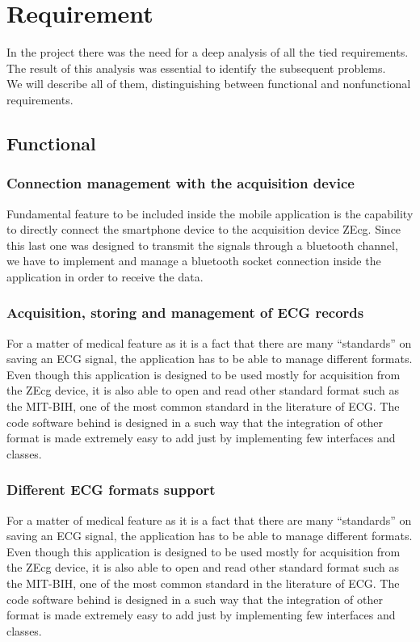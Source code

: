 \chapter{Requirement}
\label{Chapter5}
In the project there was the need for a deep analysis of all the tied requirements. The result of this analysis was essential to identify the subsequent problems.\\
We will describe all of them, distinguishing between functional and nonfunctional requirements.

\section{Functional}

\subsection{Connection management with the acquisition device}
Fundamental feature to be included inside the mobile application is the capability to directly connect the smartphone device to the acquisition device ZEcg. Since this last one was designed to transmit the signals through a bluetooth channel, we have to implement and manage a bluetooth socket connection inside the application in order to receive the data.

\subsection{Acquisition, storing and management of ECG records}
For a matter of medical feature as it is a fact that there are many “standards” on saving an ECG signal, the application has to be able to manage different formats. Even though this application is designed to be used mostly for acquisition from the ZEcg device, it is also able to open and read other standard format such as the MIT-BIH, one of the most common standard in the literature of ECG. The code software behind is designed in a such  way that the integration of other format is made extremely easy to add just by implementing few interfaces and classes.

\subsection{Different ECG formats support}
For a matter of medical feature as it is a fact that there are many “standards” on saving an ECG signal, the application has to be able to manage different formats. Even though this application is designed to be used mostly for acquisition from the ZEcg device, it is also able to open and read other standard format such as the MIT-BIH, one of the most common standard in the literature of ECG. The code software behind is designed in a such  way that the integration of other format is made extremely easy to add just by implementing few interfaces and classes.

